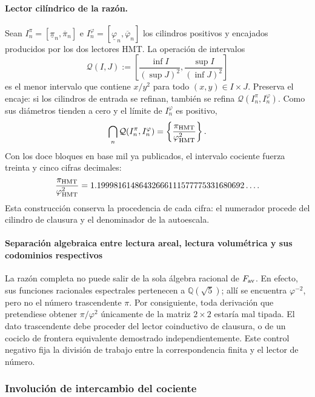 \paragraph{Lector cilíndrico de la razón.}
Sean \(I_n^\pi=[\underline\pi_n,\overline\pi_n]\) e
\(I_n^\varphi=[\underline\varphi_n,\overline\varphi_n]\) los cilindros
positivos y encajados producidos por los dos lectores HMT\@. La operación de
intervalos
\[
 \mathcal Q(I,J)
 :=
 \left[
 \frac{\inf I}{(\sup J)^2},
 \frac{\sup I}{(\inf J)^2}
 \right]
\]
es el menor intervalo que contiene \(x/y^2\) para todo
\((x,y)\in I\times J\). Preserva el encaje: si los cilindros de entrada se
refinan, también se refina \(\mathcal Q(I_n^\pi,I_n^\varphi)\). Como sus
diámetros tienden a cero y el límite de \(I_n^\varphi\) es positivo,
\[
 \bigcap_n\mathcal Q(I_n^\pi,I_n^\varphi)
 =
 \left\{\frac{\pi_{\rm HMT}}{\varphi_{\rm HMT}^2}\right\}.
\]
Con los doce bloques en base mil ya publicados, el intervalo cociente fuerza
treinta y cinco cifras decimales:
\[
 \frac{\pi_{\rm HMT}}{\varphi_{\rm HMT}^2}
 =
 1.19998161486432666111577775331680692\ldots.
\]
Esta construcción conserva la procedencia de cada cifra: el numerador
procede del cilindro de clausura y el denominador de la autoescala.

\paragraph{Separación algebraica entre lectura areal, lectura volumétrica y sus codominios respectivos}
La razón completa no puede salir de la sola álgebra racional de
\(F_{\rm av}\). En efecto, sus funciones racionales espectrales pertenecen a
\(\mathbb Q(\sqrt5)\); allí se encuentra \(\varphi^{-2}\), pero no el número
trascendente \(\pi\). Por consiguiente, toda derivación que pretendiese
obtener \(\pi/\varphi^2\) únicamente de la matriz \(2\times2\) estaría
mal tipada. El dato trascendente debe proceder del lector coinductivo de
clausura, o de un cociclo de frontera equivalente demostrado
independientemente. Este control negativo fija la división de trabajo entre
la correspondencia finita y el lector de número.

\subsubsection{Involución de intercambio del cociente}
\label{p12-83-c16-s2:sec:espejo-pi-phi-electron-hmt}

